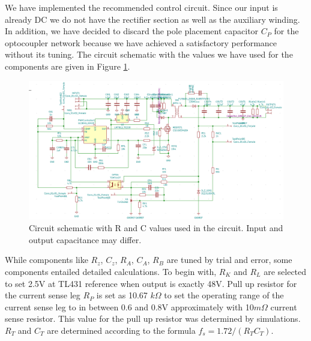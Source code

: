 \documentclass[12pt]{article}
\begin{document}
    We have implemented the recommended control circuit. Since our input is already DC we do not have the rectifier section as well as the auxiliary winding. In addition, we have decided to discard the pole placement capacitor $C_P$ for the optocoupler network because we have achieved a satisfactory performance without its tuning. The circuit schematic with the values we have used for the components are given in Figure \ref{fig:circuit_schematic}.

    \begin{figure}[H]
        \centering
        \includegraphics[width= \textwidth]{img/circuit_schematic.png}
        \caption{Circuit schematic with R and C values used in the circuit. Input and output capacitance may differ.}
        \label{fig:circuit_schematic}
    \end{figure}
    
    While components like $R_z$, $C_z$, $R_A$, $C_A$, $R_B$ are tuned by trial and error, some components entailed detailed calculations. To begin with, $R_K$ and $R_L$ are selected to set 2.5V at TL431 reference when output is exactly 48V. Pull up resistor for the current sense leg $R_P$ is set as 10.67 $k\Omega$ to set the operating range of the current sense leg to in between 0.6 and 0.8V approximately with 10$m\Omega$ current sense resistor. This value for the pull up resistor was determined by simulations. $R_T$ and $C_T$ are determined according to the formula $f_s = 1.72/(R_TC_T)$. 
\end{document}

